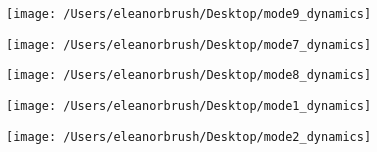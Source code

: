 \documentclass{article}
\begin{document}
\clearpage{}
\renewcommand{\thesection}{}
\renewcommand{\thesection}{S}
\renewcommand{\thesubsection}{S\arabic{subsection}}
\renewcommand{\theequation}{S\arabic{equation}}
\renewcommand{\thetable}{S\arabic{table}}
\renewcommand{\thefigure}{S\arabic{figure}}
\setcounter{equation}{0}  
\setcounter{figure}{0}
\setcounter{table}{0}

\begin{figure}
\texttt{[image: /Users/eleanorbrush/Desktop/mode9\_dynamics]}
\caption{\label{mode9}}
\end{figure}

\begin{figure}
\texttt{[image: /Users/eleanorbrush/Desktop/mode7\_dynamics]}
\caption{\label{mode7}}
\end{figure}

\begin{figure}
\texttt{[image: /Users/eleanorbrush/Desktop/mode8\_dynamics]}
\caption{\label{mode8}}
\end{figure}

\begin{figure}
\texttt{[image: /Users/eleanorbrush/Desktop/mode1\_dynamics]}
\caption{\label{mode1}}
\end{figure}


\begin{figure}
\texttt{[image: /Users/eleanorbrush/Desktop/mode2\_dynamics]}
\caption{\label{mode2}}
\end{figure}
\end{document}
